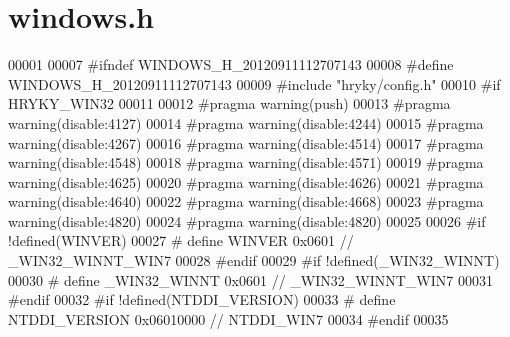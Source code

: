 \hypertarget{windows_8h_source}{\section{windows.\-h}
}

\begin{DoxyCode}
00001 
00007 \textcolor{preprocessor}{#ifndef WINDOWS\_H\_20120911112707143}
00008 \textcolor{preprocessor}{}\textcolor{preprocessor}{#define WINDOWS\_H\_20120911112707143}
00009 \textcolor{preprocessor}{}\textcolor{preprocessor}{#include "hryky/config.h"}
00010 \textcolor{preprocessor}{#if HRYKY\_WIN32}
00011 \textcolor{preprocessor}{}
00012 \textcolor{preprocessor}{#pragma warning(push)}
00013 \textcolor{preprocessor}{}\textcolor{preprocessor}{#pragma warning(disable:4127)}
00014 \textcolor{preprocessor}{}\textcolor{preprocessor}{#pragma warning(disable:4244)}
00015 \textcolor{preprocessor}{}\textcolor{preprocessor}{#pragma warning(disable:4267)}
00016 \textcolor{preprocessor}{}\textcolor{preprocessor}{#pragma warning(disable:4514)}
00017 \textcolor{preprocessor}{}\textcolor{preprocessor}{#pragma warning(disable:4548)}
00018 \textcolor{preprocessor}{}\textcolor{preprocessor}{#pragma warning(disable:4571)}
00019 \textcolor{preprocessor}{}\textcolor{preprocessor}{#pragma warning(disable:4625)}
00020 \textcolor{preprocessor}{}\textcolor{preprocessor}{#pragma warning(disable:4626)}
00021 \textcolor{preprocessor}{}\textcolor{preprocessor}{#pragma warning(disable:4640)}
00022 \textcolor{preprocessor}{}\textcolor{preprocessor}{#pragma warning(disable:4668)}
00023 \textcolor{preprocessor}{}\textcolor{preprocessor}{#pragma warning(disable:4820)}
00024 \textcolor{preprocessor}{}\textcolor{preprocessor}{#pragma warning(disable:4820)}
00025 \textcolor{preprocessor}{}
00026 \textcolor{preprocessor}{#if !defined(WINVER)}
00027 \textcolor{preprocessor}{}\textcolor{preprocessor}{#    define WINVER               0x0601 // \_WIN32\_WINNT\_WIN7}
00028 \textcolor{preprocessor}{}\textcolor{preprocessor}{#endif}
00029 \textcolor{preprocessor}{}\textcolor{preprocessor}{#if !defined(\_WIN32\_WINNT)}
00030 \textcolor{preprocessor}{}\textcolor{preprocessor}{#    define \_WIN32\_WINNT         0x0601 // \_WIN32\_WINNT\_WIN7}
00031 \textcolor{preprocessor}{}\textcolor{preprocessor}{#endif}
00032 \textcolor{preprocessor}{}\textcolor{preprocessor}{#if !defined(NTDDI\_VERSION)}
00033 \textcolor{preprocessor}{}\textcolor{preprocessor}{#    define NTDDI\_VERSION        0x06010000 // NTDDI\_WIN7}
00034 \textcolor{preprocessor}{}\textcolor{preprocessor}{#endif}
00035 \textcolor{preprocessor}{}

\end{DoxyCode}
